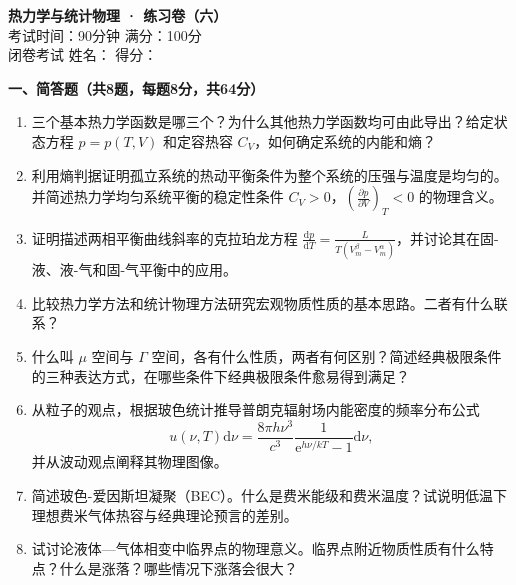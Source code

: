 \documentclass[12pt,a4paper,fontset=mac]{ctexart}
\newcommand{\ee}{\mathrm{e}}
\newcommand{\dd}{\mathrm{d}}
\newcommand{\đ}{\mathrm{đ}}
\begin{document}
\newpage

\begin{center}
{\LARGE \textbf{热力学与统计物理 · 练习卷（六）}}\\[0.5em]
{\large 考试时间：90分钟 \quad 满分：100分}\\[0.3em]
{\normalsize 闭卷考试 \quad 姓名：\underline{\hspace{3cm}} \quad 得分：\underline{\hspace{2cm}}}
\end{center}
\vspace{0.5em}

\noindent\textbf{一、简答题（共8题，每题8分，共64分）}

\begin{enumerate}
\item 三个基本热力学函数是哪三个？为什么其他热力学函数均可由此导出？给定状态方程 $p = p(T,V)$ 和定容热容 $C_V$，如何确定系统的内能和熵？

\item 利用熵判据证明孤立系统的热动平衡条件为整个系统的压强与温度是均匀的。并简述热力学均匀系统平衡的稳定性条件 $C_V > 0$，$\left(\frac{\partial p}{\partial V}\right)_T < 0$ 的物理含义。

\item 证明描述两相平衡曲线斜率的克拉珀龙方程 $\frac{\dd p}{\dd T} = \frac{L}{T(V_m^\beta - V_m^\alpha)}$，并讨论其在固-液、液-气和固-气平衡中的应用。

\item 比较热力学方法和统计物理方法研究宏观物质性质的基本思路。二者有什么联系？

\item 什么叫 $\mu$ 空间与 $\Gamma$ 空间，各有什么性质，两者有何区别？简述经典极限条件的三种表达方式，在哪些条件下经典极限条件愈易得到满足？

\item 从粒子的观点，根据玻色统计推导普朗克辐射场内能密度的频率分布公式
\[
u(\nu,T)\dd\nu = \frac{8\pi h\nu^3}{c^3}\frac{1}{\ee^{h\nu/kT} - 1}\dd\nu,
\]
并从波动观点阐释其物理图像。

\item 简述玻色-爱因斯坦凝聚（BEC）。什么是费米能级和费米温度？试说明低温下理想费米气体热容与经典理论预言的差别。

\item 试讨论液体—气体相变中临界点的物理意义。临界点附近物质性质有什么特点？什么是涨落？哪些情况下涨落会很大？
\end{enumerate}
\end{document}
